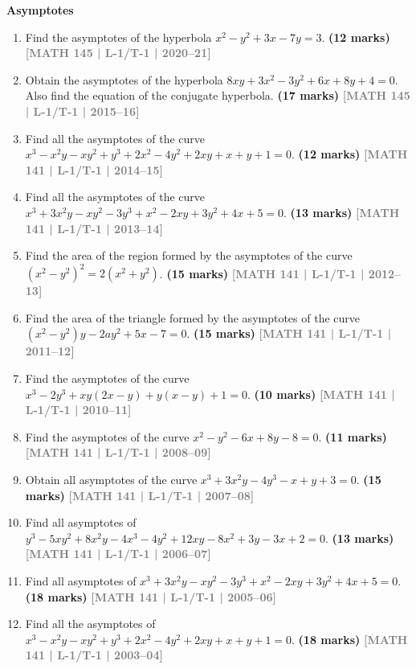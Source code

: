 \documentclass[12pt,a4paper]{article}
\newcommand{\yr}[1]{\hfill\textcolor{gray}{\small\textbf{[#1]}}}
\newcommand{\mk}[1]{\textcolor{orange!70!black}{\small\textbf{(#1 marks)}}}
\newcommand{\subtopic}[2]{%
  \vspace{10pt}
  \noindent\begin{tcolorbox}[colback=#1!8,colframe=#1,boxrule=0.6pt,arc=4pt,
    left=6pt,right=6pt,top=4pt,bottom=4pt]
    \small\bfseries\textcolor{#1}{#2}
  \end{tcolorbox}
  \vspace{2pt}
}
\begin{document}
\subtopic{cA}{Asymptotes}
\label{sub:s1-asymptotes}

\begin{enumerate}\item Find the asymptotes of the hyperbola $x^{2}-y^{2}+3x-7y=3$.
\mk{12} \yr{MATH 145 | L-1/T-1 | 2020--21}


\item Obtain the asymptotes of the hyperbola $8xy+3x^{2}-3y^{2}+6x+8y+4=0$. Also find the equation of the conjugate hyperbola.
\mk{17} \yr{MATH 145 | L-1/T-1 | 2015--16}

\item Find all the asymptotes of the curve $x^{3}-x^{2}y-xy^{2}+y^{3}+2x^{2}-4y^{2}+2xy+x+y+1=0$.
\mk{12} \yr{MATH 141 | L-1/T-1 | 2014--15}

\item Find all the asymptotes of the curve $x^{3}+3x^{2}y-xy^{2}-3y^{3}+x^{2}-2xy+3y^{2}+4x+5=0$.
\mk{13} \yr{MATH 141 | L-1/T-1 | 2013--14}

\item Find the area of the region formed by the asymptotes of the curve $(x^{2}-y^{2})^{2}=2(x^{2}+y^{2})$.
\mk{15} \yr{MATH 141 | L-1/T-1 | 2012--13}

\item Find the area of the triangle formed by the asymptotes of the curve $(x^{2}-y^{2})y-2ay^{2}+5x-7=0$.
\mk{15} \yr{MATH 141 | L-1/T-1 | 2011--12}

\item Find the asymptotes of the curve $x^{3}-2y^{3}+xy(2x-y)+y(x-y)+1=0$.
\mk{10} \yr{MATH 141 | L-1/T-1 | 2010--11}

\item Find the asymptotes of the curve $x^{2}-y^{2}-6x+8y-8=0$.
\mk{11} \yr{MATH 141 | L-1/T-1 | 2008--09}

\item Obtain all asymptotes of the curve $x^{3}+3x^{2}y-4y^{3}-x+y+3=0$.
\mk{15} \yr{MATH 141 | L-1/T-1 | 2007--08}

\item Find all asymptotes of $y^{3}-5xy^{2}+8x^{2}y-4x^{3}-4y^{2}+12xy-8x^{2}+3y-3x+2=0$.
\mk{13} \yr{MATH 141 | L-1/T-1 | 2006--07}

\item Find all asymptotes of $x^{3}+3x^{2}y-xy^{2}-3y^{3}+x^{2}-2xy+3y^{2}+4x+5=0$.
\mk{18} \yr{MATH 141 | L-1/T-1 | 2005--06}

\item Find all the asymptotes of $x^{3}-x^{2}y-xy^{2}+y^{3}+2x^{2}-4y^{2}+2xy+x+y+1=0$.
\mk{18} \yr{MATH 141 | L-1/T-1 | 2003--04}


\end{enumerate}
\end{document}
